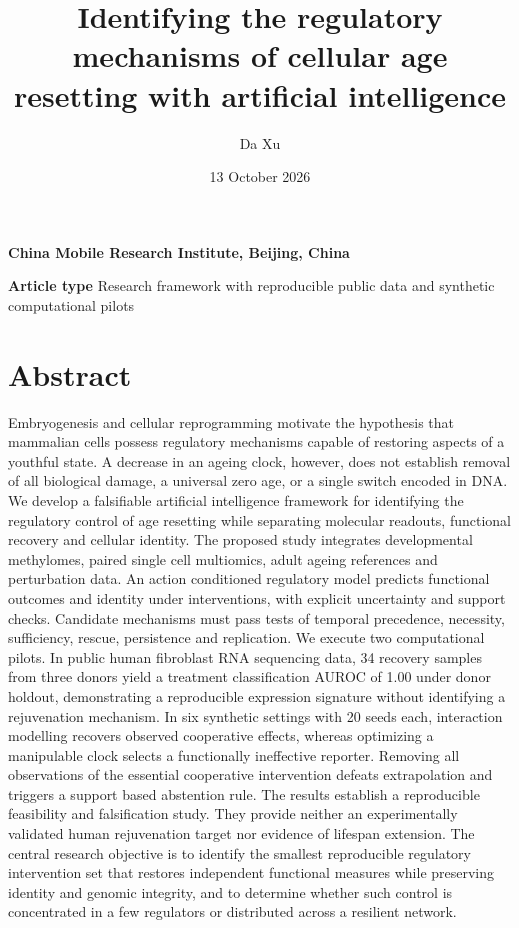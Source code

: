 \documentclass[
  11pt,
  letterpaper,
]{article}
\title{Identifying the regulatory mechanisms of cellular age resetting
with artificial intelligence}
\author{Da Xu}
\date{13 October 2026}
\begin{document}
\maketitle

\textbf{China Mobile Research Institute, Beijing, China}

\textbf{Article type} Research framework with reproducible public data
and synthetic computational pilots

\hypertarget{abstract}{%
\section{Abstract}\label{abstract}}

Embryogenesis and cellular reprogramming motivate the hypothesis that
mammalian cells possess regulatory mechanisms capable of restoring
aspects of a youthful state. A decrease in an ageing clock, however,
does not establish removal of all biological damage, a universal zero
age, or a single switch encoded in DNA. We develop a falsifiable
artificial intelligence framework for identifying the regulatory control
of age resetting while separating molecular readouts, functional
recovery and cellular identity. The proposed study integrates
developmental methylomes, paired single cell multiomics, adult ageing
references and perturbation data. An action conditioned regulatory model
predicts functional outcomes and identity under interventions, with
explicit uncertainty and support checks. Candidate mechanisms must pass
tests of temporal precedence, necessity, sufficiency, rescue,
persistence and replication. We execute two computational pilots. In
public human fibroblast RNA sequencing data, 34 recovery samples from
three donors yield a treatment classification AUROC of 1.00 under donor
holdout, demonstrating a reproducible expression signature without
identifying a rejuvenation mechanism. In six synthetic settings with 20
seeds each, interaction modelling recovers observed cooperative effects,
whereas optimizing a manipulable clock selects a functionally
ineffective reporter. Removing all observations of the essential
cooperative intervention defeats extrapolation and triggers a support
based abstention rule. The results establish a reproducible feasibility
and falsification study. They provide neither an experimentally
validated human rejuvenation target nor evidence of lifespan extension.
The central research objective is to identify the smallest reproducible
regulatory intervention set that restores independent functional
measures while preserving identity and genomic integrity, and to
determine whether such control is concentrated in a few regulators or
distributed across a resilient network.
\end{document}
